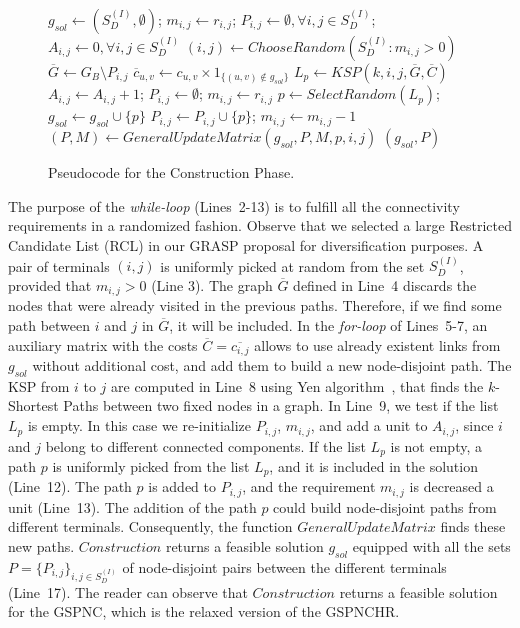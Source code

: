 \documentclass{llncs}
\begin{document}
\begin{figure}[H]
\begin{algorithm}[H]
\caption{$(sol,P) = Construction(G_B,C,R,k)$}
\begin{algorithmic}[1]
\STATE $g_{sol} \leftarrow (S_D^{(I)},\emptyset)$; $m_{i,j}\leftarrow r_{i,j}$; $P_{i,j}\leftarrow \emptyset, \forall i,j \in S_{D}^{(I)}$; $A_{i,j}\leftarrow 0, \forall i,j \in S_{D}^{(I)}$
\STATE $(i,j) \leftarrow ChooseRandom(S_{D}^{(I)}: m_{i,j}>0)$
\STATE $\overline{G} \leftarrow G_B \setminus P_{i,j}$
\STATE $\overline{c}_{u,v} \leftarrow c_{u,v} \times 1_{\{(u,v) \notin g_{sol}\}}$
\ENDFOR
\STATE $L_p \leftarrow KSP(k,i,j,\overline{G},\overline{C})$
\STATE $A_{i,j} \leftarrow A_{i,j}+1$; $P_{i,j} \leftarrow \emptyset$; $m_{i,j}\leftarrow r_{i,j}$ 
\ELSE 
\STATE $p \leftarrow SelectRandom(L_p)$; $g_{sol} \leftarrow g_{sol} \cup \{p\}$
\STATE $P_{i,j} \leftarrow P_{i,j} \cup \{p\}$; $m_{i,j} \leftarrow m_{i,j}-1$
\STATE $(P,M) \leftarrow GeneralUpdateMatrix(g_{sol},P,M,p,i,j)$
\ENDIF
\ENDWHILE
\RETURN $(g_{sol},P)$
\end{algorithmic}
\end{algorithm}
\caption{Pseudocode for the Construction Phase. \label{const}}
\end{figure}

The purpose of the \textit{while-loop} (Lines~2-13) is to fulfill all the connectivity 
requirements in a randomized fashion. Observe that we selected a large Restricted Candidate List (RCL) in 
our GRASP proposal for diversification purposes. 
A pair of terminals $(i,j)$ is uniformly picked at random from the set $S_{D}^{(I)}$, provided 
that $m_{i,j}>0$ (Line 3). The graph $\overline{G}$ defined in Line~4 discards the nodes 
that were already visited in the previous paths. Therefore, if we find some path between $i$ and 
$j$ in $\overline{G}$, it will be included. In the \textit{for-loop} of Lines~5-7, an auxiliary matrix with the costs $\overline{C}=\overline{c_{i,j}}$ allows to use already existent links from $g_{sol}$ without additional cost, and add them to build a new node-disjoint path. The KSP from $i$ to $j$ are computed in Line~8 using Yen algorithm~\cite{14}, that finds the $k$-Shortest Paths between two fixed nodes in a graph. In Line~9, we test if the list $L_p$ is empty. In this case we re-initialize $P_{i,j}$, $m_{i,j}$, and add a unit to $A_{i,j}$, since $i$ and $j$ belong to different connected components. If the list $L_p$ is not empty, a path $p$ is uniformly picked from the list $L_p$, 
and it is included in the solution (Line~12). The path $p$ is added to $P_{i,j}$, and the 
requirement $m_{i,j}$ is decreased a unit (Line~13). The addition of the path $p$ could 
build node-disjoint paths from different terminals. Consequently, the function $GeneralUpdateMatrix$ finds these new paths. $Construction$ returns a feasible solution $g_{sol}$ equipped with all the 
sets $P=\{P_{i,j}\}_{i,j \in S_{D}^{(I)}}$ of node-disjoint pairs between the different terminals 
(Line~17). The reader can observe that $Construction$ returns a feasible solution for the GSPNC, which is the 
relaxed version of the GSPNCHR. 
\end{document}
